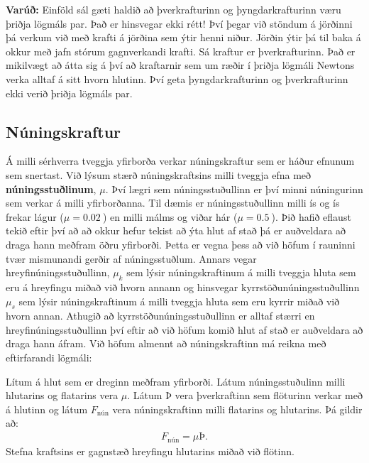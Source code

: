 \ifdefined \wholebook \else\documentclass[oneside]{book}\usepackage{EdlBook}\graphicspath{{figures/}}
\begin{document}
\textbf{Varúð:} Einföld sál gæti haldið að þverkrafturinn og þyngdarkrafturinn væru þriðja lögmáls par. Það er hinsvegar ekki rétt! Því þegar við stöndum á jörðinni þá verkum við með krafti á jörðina sem ýtir henni niður. Jörðin ýtir þá til baka á okkur með jafn stórum gagnverkandi krafti. Sá kraftur er þverkrafturinn. Það er mikilvægt að átta sig á því að kraftarnir sem um ræðir í þriðja lögmáli Newtons verka alltaf á sitt hvorn hlutinn. Því geta þyngdarkrafturinn og þverkrafturinn ekki verið þriðja lögmáls par.

\subsection*{Núningskraftur}

Á milli sérhverra tveggja yfirborða verkar núningskraftur sem er háður efnunum sem snertast. Við lýsum stærð núningskraftsins milli tveggja efna með \textbf{núningsstuðlinum}, $\mu$. Því lægri sem núningsstuðullinn er því minni núningurinn sem verkar á milli yfirborðanna. Til dæmis er núningsstuðullinn milli ís og ís frekar lágur ($\mu = \SI{0.02}{}$) en milli málms og viðar hár ($\mu = \SI{0.5}{}$). Þið hafið eflaust tekið eftir því að  að okkur hefur tekist að ýta hlut af stað þá er auðveldara að draga hann meðfram öðru yfirborði. Þetta er vegna þess að við höfum í rauninni tvær mismunandi gerðir af núningsstuðlum. Annars vegar hreyfinúningsstuðullinn, $\mu_k$ sem lýsir núningskraftinum á milli tveggja hluta sem eru á hreyfingu miðað við hvorn annann og hinsvegar kyrrstöðunúningsstuðullinn $\mu_s$ sem lýsir núningskraftinum á milli tveggja hluta sem eru kyrrir miðað við hvorn annan. Athugið að kyrrstöðunúningsstuðullinn er alltaf stærri en hreyfinúningsstuðullinn því eftir að við höfum komið hlut af stað er auðveldara að draga hann áfram. Við höfum almennt að núningskraftinn má reikna með eftirfarandi lögmáli:
\begin{tcolorbox}
\begin{theorem}
Lítum á hlut sem er dreginn meðfram yfirborði. Látum núningsstuðulinn milli hlutarins og flatarins vera $\mu$. Látum $\text{Þ}$ vera þverkraftinn sem flöturinn verkar með á hlutinn og látum $F_{\text{nún}}$ vera núningskraftinn milli flatarins og hlutarins. Þá gildir að:
\begin{align*}
    F_{\text{nún}} = \mu \text{Þ}.
\end{align*}
Stefna kraftsins er gagnstæð hreyfingu hlutarins miðað við flötinn.
\end{theorem}
\end{tcolorbox}
\end{document}
